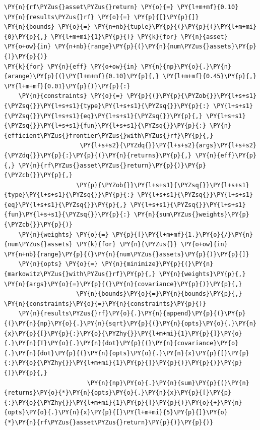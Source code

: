\begin{tcolorbox}[breakable, size=fbox, boxrule=1pt, pad at break*=1mm,colback=cellbackground, colframe=cellborder]
\begin{Verbatim}[commandchars=\\\{\}]
\PY{n}{rf\PYZus{}asset\PYZus{}return} \PY{o}{=} \PY{l+m+mf}{0.10}
\PY{n}{results\PYZus{}rf} \PY{o}{=} \PY{p}{[}\PY{p}{]}
\PY{n}{bounds} \PY{o}{=} \PY{n+nb}{tuple}\PY{p}{(}\PY{p}{(}\PY{l+m+mi}{0}\PY{p}{,} \PY{l+m+mi}{1}\PY{p}{)} \PY{k}{for} \PY{n}{asset} \PY{o+ow}{in} \PY{n+nb}{range}\PY{p}{(}\PY{n}{num\PYZus{}assets}\PY{p}{)}\PY{p}{)}
\PY{k}{for} \PY{n}{eff} \PY{o+ow}{in} \PY{n}{np}\PY{o}{.}\PY{n}{arange}\PY{p}{(}\PY{l+m+mf}{0.10}\PY{p}{,} \PY{l+m+mf}{0.45}\PY{p}{,} \PY{l+m+mf}{0.01}\PY{p}{)}\PY{p}{:}
    \PY{n}{constraints} \PY{o}{=} \PY{p}{(}\PY{p}{\PYZob{}}\PY{l+s+s1}{\PYZsq{}}\PY{l+s+s1}{type}\PY{l+s+s1}{\PYZsq{}}\PY{p}{:} \PY{l+s+s1}{\PYZsq{}}\PY{l+s+s1}{eq}\PY{l+s+s1}{\PYZsq{}}\PY{p}{,} \PY{l+s+s1}{\PYZsq{}}\PY{l+s+s1}{fun}\PY{l+s+s1}{\PYZsq{}}\PY{p}{:} \PY{n}{efficient\PYZus{}frontier\PYZus{}with\PYZus{}rf}\PY{p}{,} 
                     \PY{l+s+s2}{\PYZdq{}}\PY{l+s+s2}{args}\PY{l+s+s2}{\PYZdq{}}\PY{p}{:}\PY{p}{(}\PY{n}{returns}\PY{p}{,} \PY{n}{eff}\PY{p}{,} \PY{n}{rf\PYZus{}asset\PYZus{}return}\PY{p}{)}\PY{p}{\PYZcb{}}\PY{p}{,}
                    \PY{p}{\PYZob{}}\PY{l+s+s1}{\PYZsq{}}\PY{l+s+s1}{type}\PY{l+s+s1}{\PYZsq{}}\PY{p}{:} \PY{l+s+s1}{\PYZsq{}}\PY{l+s+s1}{eq}\PY{l+s+s1}{\PYZsq{}}\PY{p}{,} \PY{l+s+s1}{\PYZsq{}}\PY{l+s+s1}{fun}\PY{l+s+s1}{\PYZsq{}}\PY{p}{:} \PY{n}{sum\PYZus{}weights}\PY{p}{\PYZcb{}}\PY{p}{)}
    \PY{n}{weights} \PY{o}{=} \PY{p}{[}\PY{l+m+mf}{1.}\PY{o}{/}\PY{n}{num\PYZus{}assets} \PY{k}{for} \PY{n}{\PYZus{}} \PY{o+ow}{in} \PY{n+nb}{range}\PY{p}{(}\PY{n}{num\PYZus{}assets}\PY{p}{)}\PY{p}{]}
    \PY{n}{opts} \PY{o}{=} \PY{n}{minimize}\PY{p}{(}\PY{n}{markowitz\PYZus{}with\PYZus{}rf}\PY{p}{,} \PY{n}{weights}\PY{p}{,} \PY{n}{args}\PY{o}{=}\PY{p}{(}\PY{n}{covariance}\PY{p}{)}\PY{p}{,}
                    \PY{n}{bounds}\PY{o}{=}\PY{n}{bounds}\PY{p}{,} \PY{n}{constraints}\PY{o}{=}\PY{n}{constraints}\PY{p}{)}
    \PY{n}{results\PYZus{}rf}\PY{o}{.}\PY{n}{append}\PY{p}{(}\PY{p}{(}\PY{n}{np}\PY{o}{.}\PY{n}{sqrt}\PY{p}{(}\PY{n}{opts}\PY{o}{.}\PY{n}{x}\PY{p}{[}\PY{p}{:}\PY{o}{\PYZhy{}}\PY{l+m+mi}{1}\PY{p}{]}\PY{o}{.}\PY{n}{T}\PY{o}{.}\PY{n}{dot}\PY{p}{(}\PY{n}{covariance}\PY{o}{.}\PY{n}{dot}\PY{p}{(}\PY{n}{opts}\PY{o}{.}\PY{n}{x}\PY{p}{[}\PY{p}{:}\PY{o}{\PYZhy{}}\PY{l+m+mi}{1}\PY{p}{]}\PY{p}{)}\PY{p}{)}\PY{p}{)}\PY{p}{,} 
                       \PY{n}{np}\PY{o}{.}\PY{n}{sum}\PY{p}{(}\PY{n}{returns}\PY{o}{*}\PY{n}{opts}\PY{o}{.}\PY{n}{x}\PY{p}{[}\PY{p}{:}\PY{o}{\PYZhy{}}\PY{l+m+mi}{1}\PY{p}{]}\PY{p}{)}\PY{o}{+}\PY{n}{opts}\PY{o}{.}\PY{n}{x}\PY{p}{[}\PY{l+m+mi}{5}\PY{p}{]}\PY{o}{*}\PY{n}{rf\PYZus{}asset\PYZus{}return}\PY{p}{)}\PY{p}{)}
\end{Verbatim}
\end{tcolorbox}

